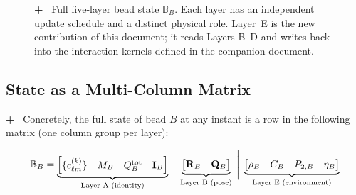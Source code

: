 \documentclass[11pt]{article}
\newcommand{\vsadd}[1]{\textcolor{vsgreen}{\textbf{+}~#1}}
\begin{document}
\begin{figure}[h!]
\caption{%
  \vsadd{%
	Full five-layer bead state $\mathbb{B}_B$.  Each layer has an independent
	update schedule and a distinct physical role.  Layer~E is the new
	contribution of this document; it reads Layers B--D and writes back into
	the interaction kernels defined in the companion document.
  }
}
\label{fig:state_layers}
\end{figure}

\subsection*{State as a Multi-Column Matrix}
\vsadd{%
Concretely, the full state of bead $B$ at any instant is a row in the
following matrix (one column group per layer):
}

\begin{equation}
\mathbb{B}_B =
\underbrace{%
  \begin{bmatrix}
	\{c_{\ell m}^{(k)}\} & M_B & Q_B^{\rm tot} & \mathbf{I}_B
  \end{bmatrix}
}_{\text{Layer A (identity)}}
\;\Bigg|\;
\underbrace{%
  \begin{bmatrix}
	\mathbf{R}_B & \mathbf{Q}_B
  \end{bmatrix}
}_{\text{Layer B (pose)}}
\;\Bigg|\;
\underbrace{%
  \begin{bmatrix}
	\rho_B & C_B & P_{2,B} & \eta_B
  \end{bmatrix}
}_{\text{Layer E (environment)}}
\label{eq:state_matrix}
\end{equation}
\end{document}
